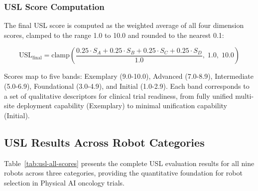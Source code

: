 \subsubsection{USL Score Computation}

The final USL score is computed as the weighted average of all four dimension
scores, clamped to the range 1.0 to 10.0 and rounded to the nearest 0.1:

$$\text{USL}_{\text{final}} = \text{clamp}\left(\frac{0.25 \cdot S_A + 0.25 \cdot S_B + 0.25 \cdot S_C + 0.25 \cdot S_D}{1.0},\; 1.0,\; 10.0\right)$$

Scores map to five bands: Exemplary (9.0-10.0), Advanced (7.0-8.9),
Intermediate (5.0-6.9), Foundational (3.0-4.9), and Initial (1.0-2.9). Each
band corresponds to a set of qualitative descriptors for clinical trial
readiness, from fully unified multi-site deployment capability (Exemplary) to
minimal unification capability (Initial).

\subsection{USL Results Across Robot Categories}
\label{subsec:usl-results}

Table~\ref{tab:usl-all-scores} presents the complete USL evaluation results for
all nine robots across three categories, providing the quantitative foundation
for robot selection in Physical AI oncology trials.

